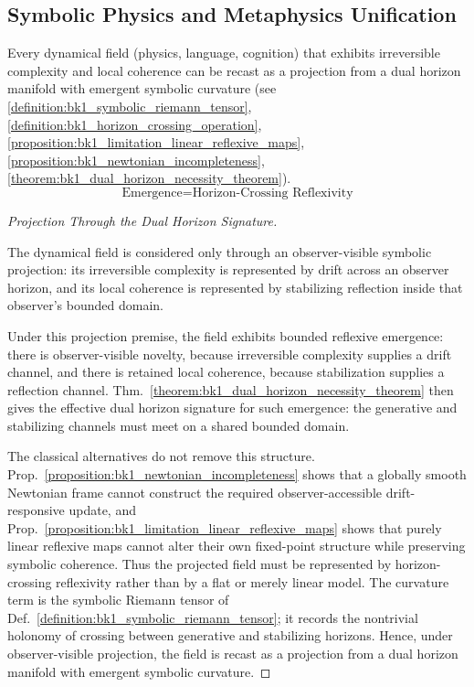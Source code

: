\subsection{Symbolic Physics and Metaphysics Unification}
\label{subsec:bk1_symbolic_physics_and_metaphysics_unification}

\begin{theorem}
\label{theorem:bk1_dual_horizon_unification_principle}
Every dynamical field (physics, language, cognition) that exhibits irreversible complexity and local coherence can be recast as a projection from a dual horizon manifold with emergent symbolic curvature (see \ref{definition:bk1_symbolic_riemann_tensor}, \ref{definition:bk1_horizon_crossing_operation}, \ref{proposition:bk1_limitation_linear_reflexive_maps}, \ref{proposition:bk1_newtonian_incompleteness}, \ref{theorem:bk1_dual_horizon_necessity_theorem}).
\[
\text{Emergence} = \text{Horizon-Crossing Reflexivity}
\]
\end{theorem}
\begin{proof}[Projection Through the Dual Horizon Signature]
\label{proof:bk1_dual_horizon_unification_principle}
\leavevmode

\begin{assumption}
The dynamical field is considered only through an observer-visible symbolic
projection: its irreversible complexity is represented by drift across an
observer horizon, and its local coherence is represented by stabilizing
reflection inside that observer's bounded domain.
\end{assumption}

Under this projection premise, the field exhibits bounded reflexive emergence:
there is observer-visible novelty, because irreversible complexity supplies a
drift channel, and there is retained local coherence, because stabilization
supplies a reflection channel. Thm.~\ref{theorem:bk1_dual_horizon_necessity_theorem}
then gives the effective dual horizon signature for such emergence: the
generative and stabilizing channels must meet on a shared bounded domain.

The classical alternatives do not remove this structure. Prop.~\ref{proposition:bk1_newtonian_incompleteness}
shows that a globally smooth Newtonian frame cannot construct the required
observer-accessible drift-responsive update, and
Prop.~\ref{proposition:bk1_limitation_linear_reflexive_maps} shows that purely
linear reflexive maps cannot alter their own fixed-point structure while
preserving symbolic coherence. Thus the projected field must be represented by
horizon-crossing reflexivity rather than by a flat or merely linear model. The
curvature term is the symbolic Riemann tensor of
Def.~\ref{definition:bk1_symbolic_riemann_tensor}; it records the nontrivial
holonomy of crossing between generative and stabilizing horizons. Hence, under
observer-visible projection, the field is recast as a projection from a dual
horizon manifold with emergent symbolic curvature.
\end{proof}

